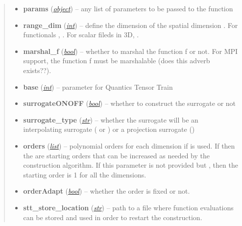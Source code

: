 \documentclass[a4paper,10pt,english]{sphinxmanual}
\begin{document}
\begin{fulllineitems}
\begin{quote}
\begin{description}
\begin{itemize}
\item {} 
\textbf{params} (\href{http://docs.python.org/library/functions.html\#object}{\emph{object}}) -- any list of parameters to be passed to the function 

\item {} 
\textbf{range\_dim} (\href{http://docs.python.org/library/functions.html\#int}{\emph{int}}) -- define the dimension of the spatial dimension . For functionals , . For scalar fileds in 3D, .

\item {} 
\textbf{marshal\_f} (\href{http://docs.python.org/library/functions.html\#bool}{\emph{bool}}) -- whether to marshal the function f or not. For MPI support, the function f must be marshalable (does this adverb exists??).

\item {} 
\textbf{base} (\href{http://docs.python.org/library/functions.html\#int}{\emph{int}}) --  parameter for Quantics Tensor Train

\item {} 
\textbf{surrogateONOFF} (\href{http://docs.python.org/library/functions.html\#bool}{\emph{bool}}) -- whether to construct the surrogate or not

\item {} 
\textbf{surrogate\_type} (\href{http://docs.python.org/library/functions.html\#str}{\emph{str}}) -- whether the surrogate will be an interpolating surrogate ( or ) or a projection surrogate ()

\item {} 
\textbf{orders} (\href{http://docs.python.org/library/functions.html\#list}{\emph{list}}) -- polynomial orders for each dimension if  is used. If  then the  are starting orders that can be increased as needed by the construction algorithm. If this parameter is not provided but , then the starting order is 1 for all the dimensions.

\item {} 
\textbf{orderAdapt} (\href{http://docs.python.org/library/functions.html\#bool}{\emph{bool}}) -- whether the order is fixed or not.

\item {} 
\textbf{stt\_store\_location} (\href{http://docs.python.org/library/functions.html\#str}{\emph{str}}) -- path to a file where function evaluations can be stored and used in order to restart the construction.


\end{itemize}
\end{description}
\end{quote}
\end{fulllineitems}
\end{document}

